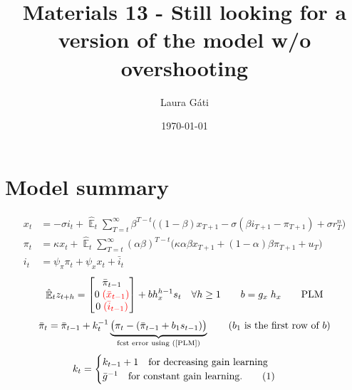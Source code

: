 \documentclass[11pt]{article}
\renewcommand{\[}{\begin{equation}}
\renewcommand{\]}{\end{equation}}
\DeclareMathOperator{\E}{\mathbb{E}}
\newcommand\numberthis{\addtocounter{equation}{1}\tag{\theequation}} %
\begin{document}
\linespread{1.0}

\title{Materials 13 - Still looking for a version of the model w/o overshooting}
\author{Laura G\'ati} 
\date{\today}
\maketitle


\tableofcontents


\section{Model summary}
\begin{align}
x_t &=  -\sigma i_t +\hat{\E}_t \sum_{T=t}^{\infty} \beta^{T-t }\big( (1-\beta)x_{T+1} - \sigma(\beta i_{T+1} - \pi_{T+1}) +\sigma r_T^n \big)  \label{prestons18}  \\
\pi_t &= \kappa x_t +\hat{\E}_t \sum_{T=t}^{\infty} (\alpha\beta)^{T-t }\big( \kappa \alpha \beta x_{T+1} + (1-\alpha)\beta \pi_{T+1} + u_T\big) \label{prestons19}  \\
i_t &= \psi_{\pi}\pi_t + \psi_{x} x_t  + \bar{i}_t \label{TR}
\end{align}
\begin{equation}
\hat{\E}_t z_{t+h} =  \begin{bmatrix}\bar{\pi}_{t-1} \\ 0 \; \textcolor{red}{(\bar{x}_{t-1}) } \\ 0 \; \textcolor{red}{(\bar{i}_{t-1}) } \end{bmatrix}+ bh_x^{h-1}s_t  \quad \forall h\geq 1 \quad \quad b = g_x \; h_x \quad \quad \text{PLM} \label{PLM}
\end{equation}
\begin{equation}
\bar{\pi}_{t} = \bar{\pi}_{t-1} +k_t^{-1}\underbrace{\big(\pi_{t} -(\bar{\pi}_{t-1}+b_1s_{t-1}) \big)}_{\text{fcst error using (\ref{PLM})} } \quad \quad  \text{($b_1$ is the first row of $b$)}
\end{equation}
 \begin{align*}
k_t & = \begin{cases} k_{t-1}+1 \quad \text{for decreasing gain learning}  \\ \bar{g}^{-1}  \quad \text{for constant gain learning.}\numberthis
\end{cases} 
\end{align*}
\end{document}
